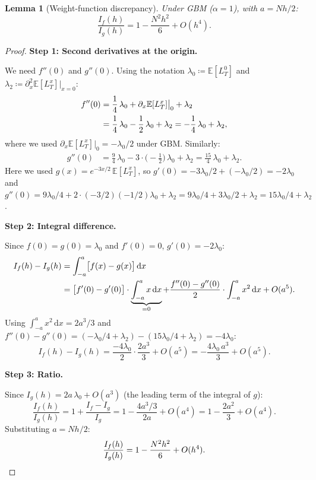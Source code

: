 \documentclass[11pt]{article}
\newtheorem{lemma}[theorem]{Lemma}
\theoremstyle{definition}
\theoremstyle{remark}
\newcommand{\E}{\mathbb{E}}
\newcommand{\dd}{\,\mathrm{d}}
\begin{document}
\begin{lemma}[Weight-function discrepancy]\label{lem:weight_discrep}
Under GBM ($\alpha = 1$), with $a = Nh/2$:
\begin{equation}\label{eq:weight_ratio}
\frac{I_f(h)}{I_g(h)} = 1 - \frac{N^2 h^2}{6} + O(h^4).
\end{equation}
\end{lemma}
\begin{proof}
\textbf{Step 1: Second derivatives at the origin.}

We need $f''(0)$ and $g''(0)$. Using the notation
$\lambda_0 \coloneqq \E[L^0_T]$ and
$\lambda_2 \coloneqq \partial_x^2\E[L^x_T]\big|_{x=0}$:
\begin{align}
f''(0) &= \frac{1}{4}\,\lambda_0 + \partial_x\E[L^x_T]\big|_0
+ \lambda_2 \notag \\
&= \frac{1}{4}\,\lambda_0 - \frac{1}{2}\,\lambda_0
+ \lambda_2
= -\frac{1}{4}\,\lambda_0 + \lambda_2,
\label{eq:f_second}
\end{align}
where we used $\partial_x\E[L^x_T]\big|_0 = -\lambda_0/2$ under GBM.
Similarly:
\begin{align}
g''(0) &= \frac{9}{4}\,\lambda_0
- 3 \cdot \bigl(-\frac{1}{2}\bigr)\,\lambda_0 + \lambda_2
= \frac{15}{4}\,\lambda_0 + \lambda_2.
\label{eq:g_second}
\end{align}
Here we used $g(x) = e^{-3x/2}\,\E[L^x_T]$, so
$g'(0) = -3\lambda_0/2 + (-\lambda_0/2) = -2\lambda_0$ and
$g''(0) = 9\lambda_0/4 + 2 \cdot (-3/2)(-1/2)\lambda_0 + \lambda_2
= 9\lambda_0/4 + 3\lambda_0/2 + \lambda_2 = 15\lambda_0/4 + \lambda_2$.

\textbf{Step 2: Integral difference.}

Since $f(0) = g(0) = \lambda_0$ and $f'(0) = 0$,
$g'(0) = -2\lambda_0$:
\begin{align}
I_f(h) - I_g(h) &= \int_{-a}^{a}\bigl[f(x) - g(x)\bigr]\dd x
\notag \\
&= \bigl[f'(0) - g'(0)\bigr] \cdot
\underbrace{\int_{-a}^a x\dd x}_{= 0}
+ \frac{f''(0) - g''(0)}{2} \cdot
\int_{-a}^a x^2\dd x + O(a^5).
\label{eq:integral_diff}
\end{align}
Using $\int_{-a}^a x^2\dd x = 2a^3/3$ and
$f''(0) - g''(0) = (-\lambda_0/4 + \lambda_2) -
(15\lambda_0/4 + \lambda_2) = -4\lambda_0$:
\begin{equation}\label{eq:integral_diff_value}
I_f(h) - I_g(h) = \frac{-4\lambda_0}{2} \cdot
\frac{2a^3}{3} + O(a^5) = -\frac{4\lambda_0\,a^3}{3} + O(a^5).
\end{equation}

\textbf{Step 3: Ratio.}

Since $I_g(h) = 2a\,\lambda_0 + O(a^3)$ (the leading term of the
integral of $g$):
\[
\frac{I_f(h)}{I_g(h)} = 1 + \frac{I_f - I_g}{I_g}
= 1 - \frac{4a^3/3}{2a} + O(a^4)
= 1 - \frac{2a^2}{3} + O(a^4).
\]
Substituting $a = Nh/2$:
\[
\frac{I_f(h)}{I_g(h)} = 1 - \frac{N^2 h^2}{6} + O(h^4).
\qedhere
\]
\end{proof}
\end{document}
